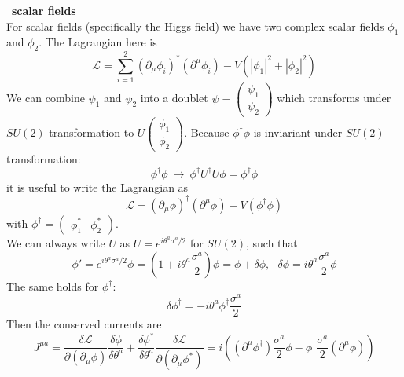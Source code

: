 \documentclass{include/thesisclass}
\newcommand{\LL}{\mathcal{L}}
\newcommand{\df}{\rightarrow}
\newcommand{\p}{\partial}
\newcommand{\vektorz}[2]{\begin{pmatrix} #1 \\ #2 \end{pmatrix}}
\newcommand{\sub}[1]{~\newline\newline\textbf{#1}\\}
\begin{document}
\sub{scalar fields}
For scalar fields (specifically the Higgs field) we have two complex scalar fields $\phi_1$ and $\phi_2$. The Lagrangian here is
\[ \LL = \sum_{i = 1}^2 ( \p _ \mu \phi_i)^*( \p^\mu \phi_i) - V( | \phi_1|^2+ | \phi_2|^2)\]
We can combine $\psi_1$ and $\psi_2$ into a doublet $\psi = \vektorz{\psi_1}{\psi_2}$ which transforms under $SU(2)$ transformation to $U \vektorz{\phi_1}{\phi_2}$. Because $\phi^\dagger \phi$ is inviariant under $SU(2)$ transformation:
\[ \phi^\dagger \phi ~\df ~ \phi^\dagger U ^\dagger U \phi = \phi^\dagger \phi\]
it is useful to write the Lagrangian as
\[ \LL = ( \p_\mu \phi)^\dagger ( \p^\mu \phi) - V( \phi^\dagger \phi)\]
with $ \phi^\dagger = \begin{pmatrix} \phi_1^* & \phi_2^*\end{pmatrix}$.\\
We can always write $U$ as $U = e^{i \theta^a \sigma^a/2}$ for $SU(2)$, such that 
\[ \phi' = e^{i \theta^a \sigma^a/2} \phi = \left( 1 + i \theta ^a \frac{\sigma^a}{2}\right) \phi = \phi + \delta \phi, ~~~\delta \phi = i \theta^a \frac{\sigma^a}{2} \phi\]
The same holds for $\phi^\dagger$:
\[ \delta \phi^\dagger = - i \theta^a \phi^\dagger \frac{\sigma^a}{2}\]
Then the conserved currents are
\[ J^{\mu a} = \frac{ \delta \LL}{\p ( \p_\mu \phi)} \frac{\delta \phi}{\delta \theta^a} + \frac{\delta \phi^*}{\delta \theta^a} \frac{\delta \LL}{\p ( \p_\mu \phi^*)} = i\left( ( \p^\mu \phi^\dagger) \frac{\sigma^a}{2} \phi - \phi^\dagger \frac{\sigma^a}{2} ( \p^\mu \phi) \right)  \]
\end{document}
